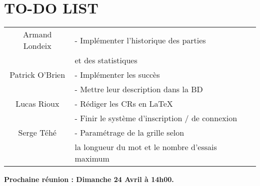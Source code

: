\section*{TO-DO LIST}

\begin{center}
\begin{tabular}{|c|l|}
    \hline
    Armand Londeix & - Implémenter l'historique des parties \\
    & et des statistiques \\
    \hline
    Patrick O'Brien & - Implémenter les succès \\
    & - Mettre leur description dans la BD \\

    \hline
    Lucas Rioux & - Rédiger les CRs en \LaTeX{} \\
    & - Finir le système d'inscription / de connexion \\
    \hline
    Serge Téhé & - Paramétrage de la grille selon \\
    & la longueur du mot et le nombre d'essais maximum \\
    \hline
\end{tabular}
\end{center}

\tabto{0cm}\textbf{Prochaine réunion : Dimanche 24 Avril à 14h00.}
